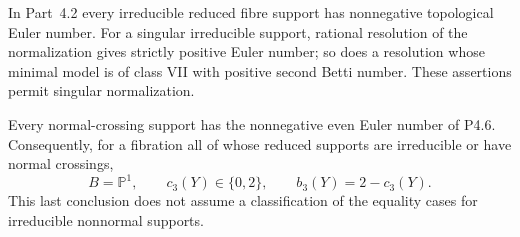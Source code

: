 
\begin{proposition}[P4.26]\hypertarget{tag-02WY}{}\label{night:P4.26}\label{stmt:P4.26}


In Part~4.2 every irreducible reduced fibre support
has nonnegative topological Euler number. For a
singular irreducible support, rational resolution
of the normalization gives strictly positive
Euler number; so does a resolution whose minimal
model is of class VII with positive second
Betti number. These assertions permit singular
normalization.

Every normal-crossing support has the
nonnegative even Euler number of P4.6.
Consequently, for a fibration all of whose
reduced supports are irreducible or have
normal crossings,
\[
 B=\mathbb P^1,\qquad c_3(Y)\in\{0,2\},
 \qquad b_3(Y)=2-c_3(Y).
\]
This last conclusion does not assume a
classification of the equality cases for
irreducible nonnormal supports.
\end{proposition}

